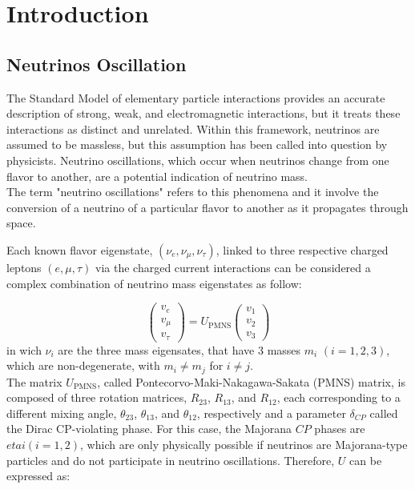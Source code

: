 \chapter{Introduction}
\section{Neutrinos Oscillation}
The Standard Model of elementary particle interactions provides an accurate description of strong, weak, and electromagnetic interactions, but it treats these interactions as distinct and unrelated. Within this framework, neutrinos are assumed to be massless, but this assumption has been called into question by physicists. Neutrino oscillations, which occur when neutrinos change from one flavor to another, are a potential indication of neutrino mass.\\
The term "neutrino oscillations" refers to this phenomena and it involve the conversion of a neutrino of a particular flavor to another as it propagates through space.

Each known flavor eigenstate, $(\nu_e,\nu_{\mu},\nu_{\tau})$, linked to three respective charged leptons $(e,\mu,\tau)$  via the charged current interactions can be considered a complex combination of neutrino mass eigenstates as follow:

\begin{equation*}
	\left(\begin{array}{l}
		v_e \\
		v_\mu \\
		v_\tau
	\end{array}\right)=U_{\mathrm{PMNS}}\left(\begin{array}{l}
		v_1 \\
		v_2 \\
		v_3
	\end{array}\right)
\end{equation*}
in wich $\nu_i$ are the three mass eigensates, that have 3 masses  $m_i$  $(i = 1,2,3)$, which are non-degenerate, with $m_i \neq m_j$ for $i \neq j$.\\

The matrix $U_{\mathrm{PMNS}}$, called Pontecorvo-Maki-Nakagawa-Sakata (PMNS) matrix, is composed of three rotation matrices, $R_{23}$, $R_{13}$, and $R_{12}$, each corresponding to a different mixing angle, $\theta_{23}$, $\theta_{13}$, and $\theta_{12}$, respectively and a parameter $\delta_{CP}$ called the Dirac CP-violating phase. For this case, the Majorana $C P$ phases are $eta i(i=1,2)$, which are only physically possible if neutrinos are Majorana-type particles and do not participate in neutrino oscillations. Therefore, $U$ can be expressed as:

